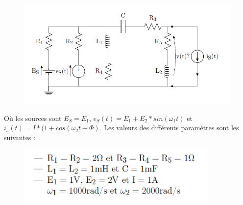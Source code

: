 \begin{figure}[h!]
    \centering
    \includegraphics[width = 17cm]{TpQEx_Circuits/Q4_Juin_2016.PNG}
    \label{fig:Q4_TheoCircuitsJuin2016}
\end{figure}
Où les sources sont $E_S = E_1$, $e_{S}(t) = E_1 +E_2*sin(\omega_1 t)$ et $i_s(t) = I * (1+cos(\omega_2 t+\Phi)$. 
Les valeurs des différents paramètres sont les suivantes :
\begin{figure}[h!]
    \includegraphics[width = 10cm]{TpQEx_Circuits/Q4_Juin_2016_HINT.PNG}
    \label{fig:Q4_TheoCircuitsJuin2016_HINT}
\end{figure}

